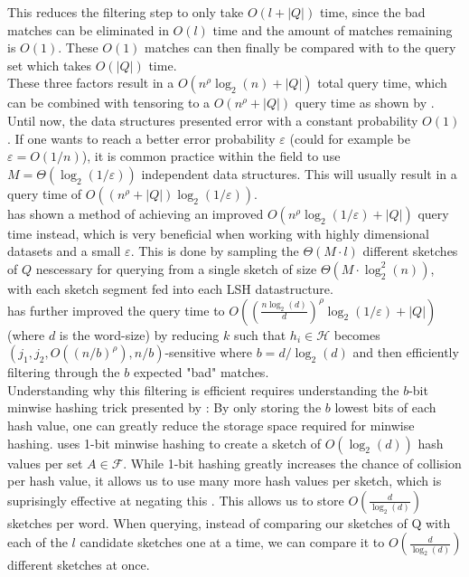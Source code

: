 This reduces the filtering step to only take $O(l + |Q|)$ time, since the bad matches can be eliminated in $O(l)$ time and the amount of matches remaining is $O(1)$. These $O(1)$ matches can then finally be compared with to the query set which takes $O(|Q|)$ time.\\
These three factors result in a $O(n^\rho \log_2(n) + |Q|)$ total query time, which can be combined with tensoring to a $O(n^\rho + |Q|)$ query time as shown by \citet{christiani2018fast}.\\
Until now, the data structures presented error with a constant probability $O(1)$. If one wants to reach a better error probability $\varepsilon$ (could for example be $\varepsilon = O(1/n)$), it is common practice within the field to use $M=\Theta(\log_2(1/\varepsilon))$ independent data structures. This will usually result in a query time of $O((n^\rho + |Q|)\log_2(1/\varepsilon))$. \\
\citet{fast-similarity-search} has shown a method of achieving an improved $O(n^\rho \log_2(1/\varepsilon)+|Q|)$ query time instead, which is very beneficial when working with highly dimensional datasets and a small $\varepsilon$. This is done by sampling the $\Theta(M\cdot l)$ different sketches of $Q$ nescessary for querying from a single sketch of size $\Theta(M\cdot \log^2_2(n))$, with each sketch segment fed into each LSH datastructure. \\
\citet{fast-similarity-search} has further improved the query time to $O((\frac{n\log_2(d)}{d})^{\rho}\log_2(1/\varepsilon)+|Q|)$ (where $d$ is the word-size) by reducing $k$ such that $h_i\in \mathcal{H}$ becomes $(j_1, j_2, O((n/b)^\rho), n/b)$-sensitive where $b=d/\log_2(d)$ and then efficiently filtering through the $b$ expected "bad" matches. \\
Understanding why this filtering is efficient requires understanding the $b$-bit minwise hashing trick presented by \citet{li2011hashing}:
By only storing the $b$ lowest bits of each hash value, one can greatly reduce the storage space required for minwise hashing. \citet{fast-similarity-search} uses 1-bit minwise hashing to create a sketch of $O(\log_2(d))$ hash values per set $A\in \mathcal{F}$.
While 1-bit hashing greatly increases the chance of collision per hash value, it allows us to use many more hash values per sketch, which is suprisingly effective at negating this \cite{li2011hashing}.
This allows us to store $O(\frac{d}{\log_2(d)})$ sketches per word. When querying, instead of comparing our sketches of Q with each of the $l$ candidate sketches one at a time, we can compare it to $O(\frac{d}{\log_2(d)})$ different sketches at once. \\
